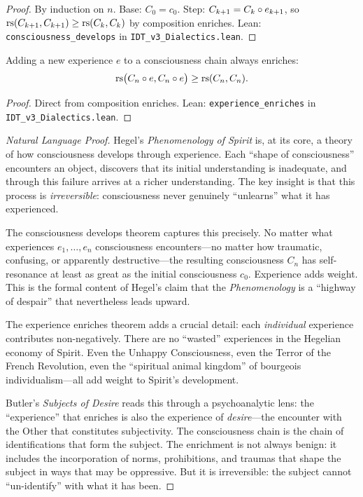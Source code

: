 \begin{proof}
By induction on $n$. Base: $C_0 = c_0$. Step: $C_{k+1} = C_k \circ e_{k+1}$,
so $\mathrm{rs}(C_{k+1}, C_{k+1}) \geq \mathrm{rs}(C_k, C_k)$ by composition enriches.
Lean: \texttt{consciousness\_develops} in \texttt{IDT\_v3\_Dialectics.lean}.
\end{proof}

\begin{theorem}
\label{thm:experience-enriches}
Adding a new experience $e$ to a consciousness chain always enriches:
\[
\mathrm{rs}\bigl(C_n \circ e, C_n \circ e\bigr) \geq \mathrm{rs}(C_n, C_n).
\]
\end{theorem}

\begin{proof}
Direct from composition enriches.
Lean: \texttt{experience\_enriches} in \texttt{IDT\_v3\_Dialectics.lean}.
\end{proof}

\begin{proof}[Natural Language Proof]
Hegel's \textit{Phenomenology of Spirit} is, at its core, a theory of how
consciousness develops through experience. Each ``shape of consciousness''
encounters an object, discovers that its initial understanding is inadequate,
and through this failure arrives at a richer understanding. The key insight is
that this process is \emph{irreversible}: consciousness never genuinely
``unlearns'' what it has experienced.

The consciousness develops theorem captures this precisely. No matter what
experiences $e_1, \ldots, e_n$ consciousness encounters---no matter how
traumatic, confusing, or apparently destructive---the resulting consciousness
$C_n$ has self-resonance at least as great as the initial consciousness $c_0$.
Experience adds weight. This is the formal content of Hegel's claim that the
\textit{Phenomenology} is a ``highway of despair'' that nevertheless leads
upward.

The experience enriches theorem adds a crucial detail: each \emph{individual}
experience contributes non-negatively. There are no ``wasted'' experiences in
the Hegelian economy of Spirit. Even the Unhappy Consciousness, even the
Terror of the French Revolution, even the ``spiritual animal kingdom'' of
bourgeois individualism---all add weight to Spirit's development.

Butler's \textit{Subjects of Desire} reads this through a psychoanalytic lens:
the ``experience'' that enriches is also the experience of \emph{desire}---the
encounter with the Other that constitutes subjectivity. The consciousness
chain is the chain of identifications that form the subject. The enrichment
is not always benign: it includes the incorporation of norms, prohibitions,
and traumas that shape the subject in ways that may be oppressive. But it is
irreversible: the subject cannot ``un-identify'' with what it has been.
\end{proof}

